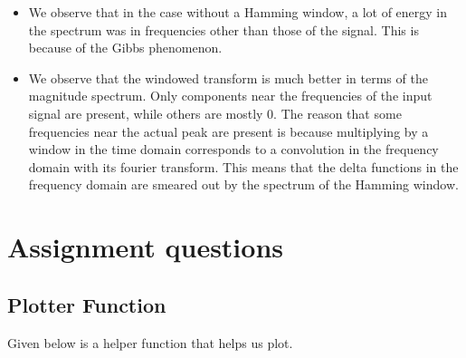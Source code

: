\documentclass{article}
\begin{document}
\begin{itemize}
    \item
      We observe that in the case without a Hamming window, a lot of energy
      in the spectrum was in frequencies other than those of the signal.
      This is because of the Gibbs phenomenon.
    \item
      We observe that the windowed transform is much better in terms of the
      magnitude spectrum. Only components near the frequencies of the input
      signal are present, while others are mostly 0. The reason that some
      frequencies near the actual peak are present is because multiplying by
      a window in the time domain corresponds to a convolution in the
      frequency domain with its fourier transform. This means that the delta
      functions in the frequency domain are smeared out by the spectrum of
      the Hamming window.
\end{itemize}
    
    

\section{Assignment questions}

\subsection{Plotter Function}
Given below is a helper function that helps us plot.
\end{document}

